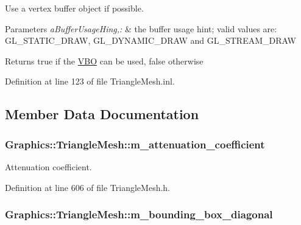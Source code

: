 Use a vertex buffer object if possible. 


\begin{DoxyParams}{Parameters}
{\em aBufferUsageHing,:} & the buffer usage hint; valid values are: GL\_\-STATIC\_\-DRAW, GL\_\-DYNAMIC\_\-DRAW and GL\_\-STREAM\_\-DRAW \\
\hline
\end{DoxyParams}
\begin{DoxyReturn}{Returns}
true if the \hyperlink{class_graphics_1_1_v_b_o}{VBO} can be used, false otherwise 
\end{DoxyReturn}


Definition at line 123 of file TriangleMesh.inl.



\subsection{Member Data Documentation}
\hypertarget{class_graphics_1_1_triangle_mesh_af5c6eb131b9455e3b2dad2b4637b3fea}{
\subsubsection[{m\_\-attenuation\_\-coefficient}]{ {\bf Graphics::TriangleMesh::m\_\-attenuation\_\-coefficient}}}
\label{class_graphics_1_1_triangle_mesh_af5c6eb131b9455e3b2dad2b4637b3fea}


Attenuation coefficient. 



Definition at line 606 of file TriangleMesh.h.

\hypertarget{class_graphics_1_1_triangle_mesh_ab5f109d58c738507ae99bdcddcb48c34}{
\subsubsection[{m\_\-bounding\_\-box\_\-diagonal}]{ {\bf Graphics::TriangleMesh::m\_\-bounding\_\-box\_\-diagonal}}}
\label{class_graphics_1_1_triangle_mesh_ab5f109d58c738507ae99bdcddcb48c34}


